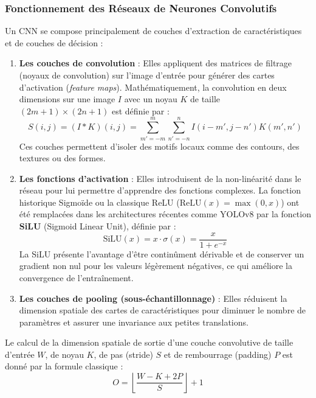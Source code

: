 \documentclass[12pt,a4paper]{article}
\begin{document}
\subsubsection{Fonctionnement des Réseaux de Neurones Convolutifs}
Un CNN se compose principalement de couches d'extraction de caractéristiques et de couches de décision :
\begin{enumerate}
  \item \textbf{Les couches de convolution} : Elles appliquent des matrices de filtrage (noyaux de convolution) sur l'image d'entrée pour générer des cartes d'activation (\textit{feature maps}). Mathématiquement, la convolution en deux dimensions sur une image $I$ avec un noyau $K$ de taille $(2m+1) \times (2n+1)$ est définie par :
  \begin{equation}
    S(i, j) = (I * K)(i, j) = \sum_{m'=-m}^{m} \sum_{n'=-n}^{n} I(i - m', j - n') K(m', n')
  \end{equation}
  Ces couches permettent d'isoler des motifs locaux comme des contours, des textures ou des formes.
  
  \item \textbf{Les fonctions d'activation} : Elles introduisent de la non-linéarité dans le réseau pour lui permettre d'apprendre des fonctions complexes. La fonction historique Sigmoïde ou la classique ReLU ($\text{ReLU}(x) = \max(0, x)$) ont été remplacées dans les architectures récentes comme YOLOv8 par la fonction \textbf{SiLU} (Sigmoid Linear Unit), définie par :
  \begin{equation}
    \text{SiLU}(x) = x \cdot \sigma(x) = \frac{x}{1 + e^{-x}}
  \end{equation}
  La SiLU présente l'avantage d'être continûment dérivable et de conserver un gradient non nul pour les valeurs légèrement négatives, ce qui améliore la convergence de l'entraînement.
  
  \item \textbf{Les couches de pooling (sous-échantillonnage)} : Elles réduisent la dimension spatiale des cartes de caractéristiques pour diminuer le nombre de paramètres et assurer une invariance aux petites translations.
\end{enumerate}

Le calcul de la dimension spatiale de sortie d'une couche convolutive de taille d'entrée $W$, de noyau $K$, de pas (stride) $S$ et de rembourrage (padding) $P$ est donné par la formule classique :
\begin{equation}
  O = \left\lfloor \frac{W - K + 2P}{S} \right\rfloor + 1
\end{equation}
\end{document}
